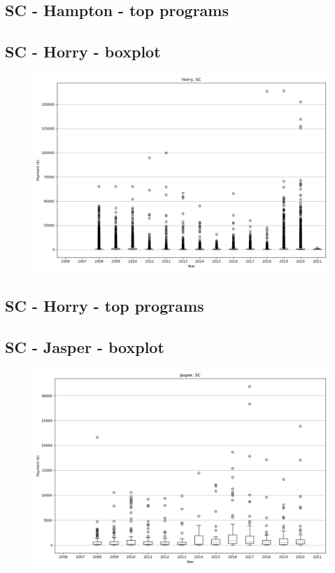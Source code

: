 \subsection*{SC - Hampton - top programs}

\newpage
\subsection*{SC - Horry - boxplot}
\begin{figure}[h]
\centering
\includegraphics[width=7in]{../output/boxplots/counties/Horry-SC_boxplot.png}
\end{figure}


\subsection*{SC - Horry - top programs}

\newpage
\subsection*{SC - Jasper - boxplot}
\begin{figure}[h]
\centering
\includegraphics[width=7in]{../output/boxplots/counties/Jasper-SC_boxplot.png}
\end{figure}


